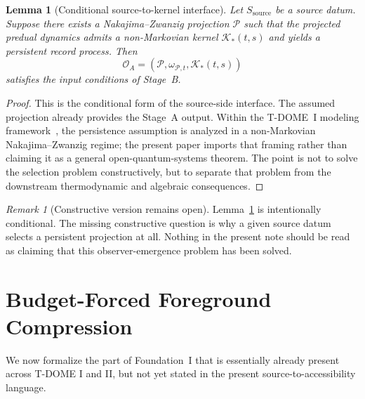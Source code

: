 \documentclass[12pt]{article}
\newtheorem{lemma}[theorem]{Lemma}
\theoremstyle{definition}
\theoremstyle{remark}
\newtheorem{remark}[theorem]{Remark}
\begin{document}
\begin{lemma}[Conditional source-to-kernel interface]\label{lem:A}
Let \(S_{\mathrm{source}}\) be a source datum. Suppose there exists a
Nakajima--Zwanzig projection \(\mathcal P\) such that the projected
predual dynamics admits a non-Markovian kernel \(\mathcal K_*(t,s)\)
and yields a persistent record process. Then
\[
\mathcal O_A=(\mathcal P,\omega_{\mathcal P,t},\mathcal K_*(t,s))
\]
satisfies the input conditions of Stage~B.
\end{lemma}

\begin{proof}
This is the conditional form of the source-side interface. The assumed
projection already provides the Stage~A output. Within the T-DOME~I
modeling framework~\cite{TDOMEI}, the persistence assumption is analyzed
in a non-Markovian Nakajima--Zwanzig regime; the present paper imports
that framing rather than claiming it as a general open-quantum-systems
theorem. The point is not to solve the selection problem
constructively, but to separate that problem from the downstream
thermodynamic and algebraic consequences.
\end{proof}

\begin{remark}[Constructive version remains open]
Lemma~\ref{lem:A} is intentionally conditional. The missing constructive
question is why a given source datum selects a persistent projection at
all. Nothing in the present note should be read as claiming that this
observer-emergence problem has been solved.
\end{remark}

\section{Budget-Forced Foreground Compression}\label{sec:budget}

We now formalize the part of Foundation~I that is essentially
already present across T-DOME I and II, but not yet stated in the
present source-to-accessibility language.
\end{document}
